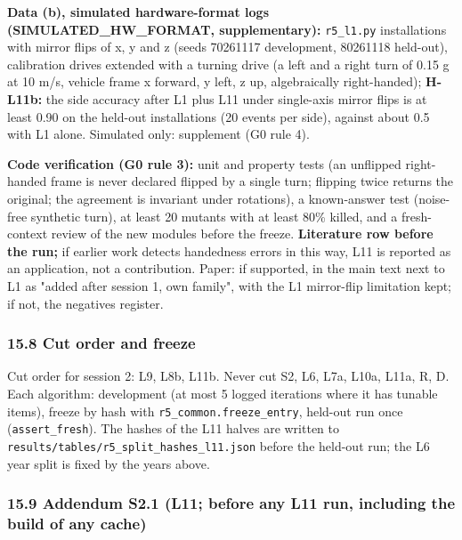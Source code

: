 \textbf{Data (b), simulated hardware-format logs (SIMULATED\_HW\_FORMAT, supplementary):} \texttt{r5\_l1.py} installations with mirror flips of x, y and z (seeds 70261117 development, 80261118 held-out), calibration drives extended with a turning drive (a left and a right turn of 0.15 g at 10 m/s, vehicle frame x forward, y left, z up, algebraically right-handed); \textbf{H-L11b:} the side accuracy after L1 plus L11 under single-axis mirror flips is at least 0.90 on the held-out installations (20 events per side), against about 0.5 with L1 alone. Simulated only: supplement (G0 rule 4).

\textbf{Code verification (G0 rule 3):} unit and property tests (an unflipped right-handed frame is never declared flipped by a single turn; flipping twice returns the original; the agreement is invariant under rotations), a known-answer test (noise-free synthetic turn), at least 20 mutants with at least 80\% killed, and a fresh-context review of the new modules before the freeze. \textbf{Literature row before the run;} if earlier work detects handedness errors in this way, L11 is reported as an application, not a contribution. Paper: if supported, in the main text next to L1 as "added after session 1, own family", with the L1 mirror-flip limitation kept; if not, the negatives register.

\subsubsection*{15.8 Cut order and freeze}

Cut order for session 2: L9, L8b, L11b. Never cut S2, L6, L7a, L10a, L11a, R, D. Each algorithm: development (at most 5 logged iterations where it has tunable items), freeze by hash with \texttt{r5\_common.freeze\_entry}, held-out run once (\texttt{assert\_fresh}). The hashes of the L11 halves are written to \texttt{results/tables/r5\_split\_hashes\_l11.json} before the held-out run; the L6 year split is fixed by the years above.


\subsubsection*{15.9 Addendum S2.1 (L11; before any L11 run, including the build of any cache)}

